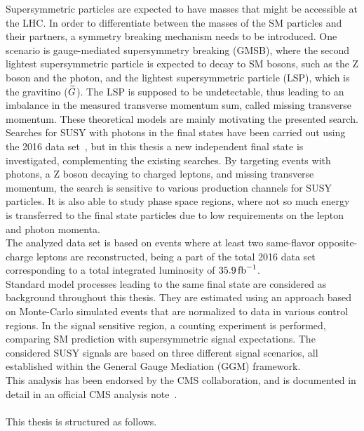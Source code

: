 Supersymmetric particles are expected to have masses that might be accessible at the LHC. In order to differentiate between the masses of the SM particles and their partners, a symmetry breaking mechanism needs to be introduced. One scenario is gauge-mediated supersymmetry breaking (GMSB), where the second lightest supersymmetric particle is expected to decay to SM bosons, such as the Z boson and the photon, and the lightest supersymmetric particle (LSP), which is the gravitino ($\widetilde{G}$). The LSP is supposed to be undetectable, thus leading to an imbalance in the measured transverse momentum sum, called missing transverse momentum. These theoretical models are mainly motivating the presented search.\\
Searches for SUSY with photons in the final states have been carried out using the 2016 data set~\cite{PhotonHT,PhotonMet,PhotonBJet,PhotonLepton}, but in this thesis a new independent final state is investigated, complementing the existing searches. By targeting events with photons, a Z boson decaying to charged leptons, and missing transverse momentum, the search is sensitive to various production channels for SUSY particles. It is also able to study phase space regions, where not so much energy is transferred to the final state particles due to low requirements on the lepton and photon momenta.\\
The analyzed data set is based on events where at least two same-flavor opposite-charge leptons are reconstructed, being a part of the total 2016 data set corresponding to a total integrated luminosity of $35.9\mbox{\ensuremath{\,\text{fb}^\text{$-$1}}}$.\\
Standard model processes leading to the same final state are considered as background throughout this thesis. They are estimated using an approach based on Monte-Carlo simulated events that are normalized to data in various control regions. In the signal sensitive region, a counting experiment is performed, comparing SM prediction with supersymmetric signal expectations. The considered SUSY signals are based on three different signal scenarios, all established within the General Gauge Mediation (GGM) framework.\\
This analysis has been endorsed by the CMS collaboration, and is documented in detail in an official CMS analysis note~\cite{MyAN}.\\\\
This thesis is structured as follows.
